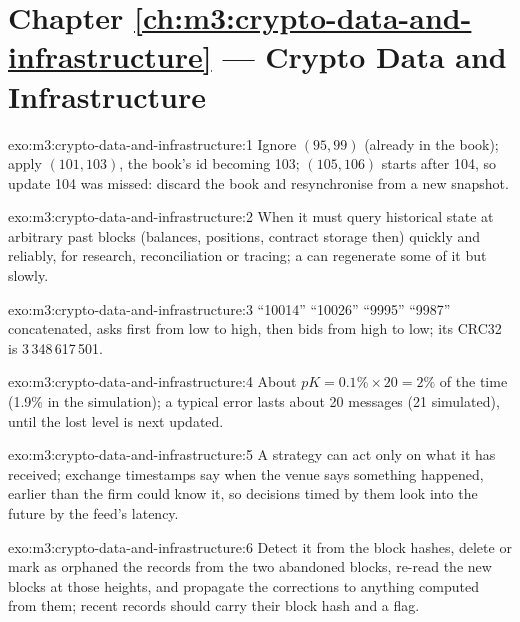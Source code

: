 \section*{Chapter \ref{ch:m3:crypto-data-and-infrastructure} --- Crypto Data and Infrastructure}

\begin{solution}{exo:m3:crypto-data-and-infrastructure:1}
Ignore $(95, 99)$ (already in the book); apply $(101, 103)$, the book's id becoming 103; $(105, 106)$ starts after 104, so update 104 was
missed: discard the book and resynchronise from a new snapshot.
\end{solution}

\begin{solution}{exo:m3:crypto-data-and-infrastructure:2}
When it must query historical state at arbitrary past blocks (balances, positions, contract storage then) quickly and reliably, for research,
reconciliation or tracing; a  can regenerate some of it but slowly.
\end{solution}

\begin{solution}{exo:m3:crypto-data-and-infrastructure:3}
``10014'' ``10026'' ``9995'' ``9987'' concatenated, asks first from low to high, then bids from high to low; its CRC32 is 3\,348\,617\,501.
\end{solution}

\begin{solution}{exo:m3:crypto-data-and-infrastructure:4}
About $pK = 0.1\% \times 20 = 2\%$ of the time (1.9\% in the simulation); a typical error lasts about 20 messages (21 simulated), until the lost level
is next updated.
\end{solution}

\begin{solution}{exo:m3:crypto-data-and-infrastructure:5}
A strategy can act only on what it has received; exchange timestamps say when the venue says something happened, earlier than the firm could know it,
so decisions timed by them look into the future by the feed's latency.
\end{solution}

\begin{solution}{exo:m3:crypto-data-and-infrastructure:6}
Detect it from the block hashes, delete or mark as orphaned the records from the two abandoned blocks, re-read the new blocks at those heights, and
propagate the corrections to anything computed from them; recent records should carry their block hash and a  flag.
\end{solution}

